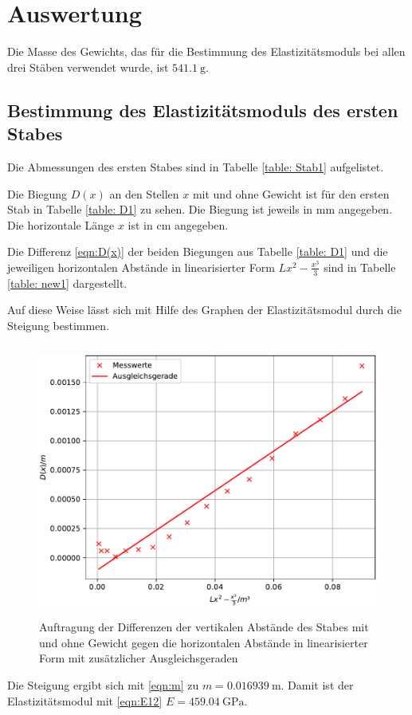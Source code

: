 \newpage
\section{Auswertung}
\label{sec:Auswertung}
Die Masse des Gewichts, das für die Bestimmung des Elastizitätsmoduls
bei allen drei Stäben verwendet wurde, ist $\SI{541.1}{\gram}$.

\subsection{Bestimmung des Elastizitätsmoduls des ersten Stabes}
Die Abmessungen des ersten Stabes sind in Tabelle
\ref{table: Stab1} aufgelistet.

\noindent Die Biegung $D(x)$ an den Stellen $x$ mit und ohne Gewicht
ist für den ersten Stab in Tabelle \ref{table: D1} zu sehen. Die Biegung ist
jeweils in $\si{\mm}$ angegeben.
Die horizontale Länge $x$ ist in $\si{\cm}$ angegeben.

\noindent Die Differenz \eqref{eqn:D(x)} der beiden Biegungen aus Tabelle \ref{table: D1} 
und die jeweiligen horizontalen Abstände in linearisierter Form $Lx^2-\frac{x^3}{3}$
sind in Tabelle \ref{table: new1} dargestellt.


\noindent Auf diese Weise lässt sich mit Hilfe des Graphen %
der Elastizitätsmodul durch die Steigung bestimmen.
\begin{figure}
  \centering
  \includegraphics[width=12cm, height=9cm]{./plots/Stange1.pdf}
  \caption{Auftragung der Differenzen der vertikalen Abstände des Stabes mit und ohne Gewicht gegen die horizontalen Abstände in linearisierter Form mit zusätzlicher Ausgleichsgeraden}
  \label{fig:plot1}
\end{figure}
\noindent Die Steigung ergibt sich mit \eqref{eqn:m}
zu $m = \SI{0.016939}{\meter}$. Damit ist der Elastizitätsmodul mit \eqref{eqn:E12}%
$E = \SI{459.04}{\giga\pascal}$.
\newpage

